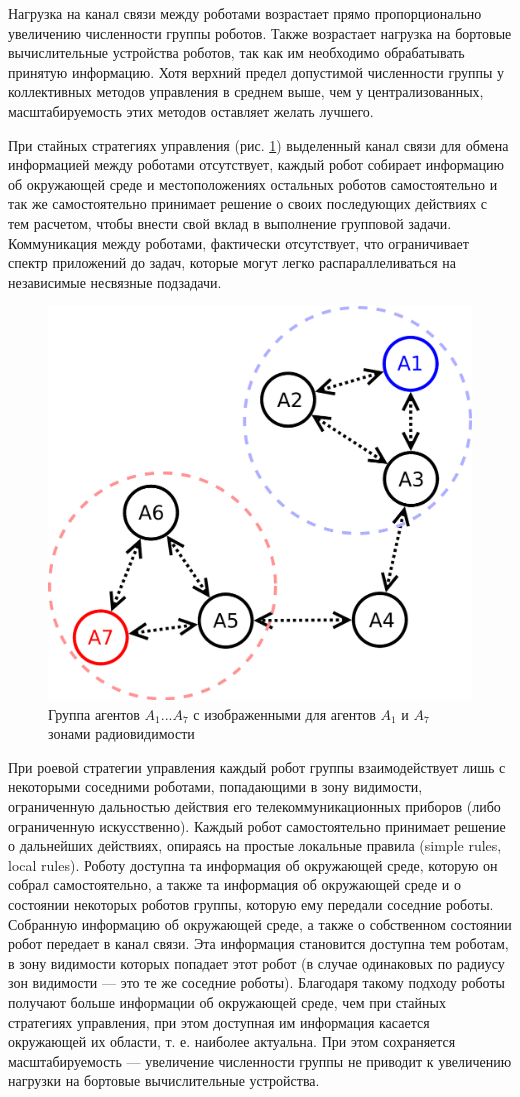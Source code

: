 \documentclass[a4paper, 14pt]{extarticle}
\begin{document}
Нагрузка на канал
связи между роботами возрастает прямо пропорционально увеличению численности группы роботов. Также возрастает нагрузка на бортовые вычислительные устройства роботов, так как им необходимо обрабатывать принятую информацию. Хотя
верхний предел допустимой численности группы у коллективных методов управления в среднем выше, чем у централизованных, масштабируемость этих методов оставляет желать лучшего. \par
\bigskip
При стайных стратегиях управления (рис. \ref{fig:decen-platoon-roe}) выделенный канал связи для обмена информацией между роботами отсутствует, каждый робот собирает информацию об окружающей среде и местоположениях остальных роботов самостоятельно и так же самостоятельно принимает решение о своих последующих действиях с тем расчетом, чтобы внести свой вклад в выполнение групповой задачи. Коммуникация между роботами, фактически отсутствует, что ограничивает спектр приложений до задач, которые могут легко распараллеливаться на независимые несвязные подзадачи. \par
\begin{figure}[!htbp]
	\centering
	\includegraphics[width=0.55\linewidth]{others/decen-platoon-roe}
	\caption{Группа агентов $A_1$...$A_7$ с изображенными для агентов $A_1$ и $A_7$ зонами радиовидимости}
	\label{fig:decen-platoon-roe}
\end{figure}

\bigskip
При роевой стратегии управления каждый робот
группы взаимодействует лишь с некоторыми
соседними роботами, попадающими в зону видимости, ограниченную дальностью действия
его телекоммуникационных приборов (либо ограниченную искусственно). Каждый робот
самостоятельно принимает решение о дальнейших действиях, опираясь на простые локальные правила (simple rules, local rules). Роботу
доступна та информация об окружающей среде, которую он собрал самостоятельно, а также
та информация об окружающей среде и о состоянии некоторых роботов группы, которую
ему передали соседние роботы. Собранную информацию об окружающей среде, а также
о собственном состоянии робот передает в канал связи. Эта информация становится доступна тем роботам, в зону видимости которых попадает этот робот (в случае одинаковых по радиусу зон видимости — это те же соседние
роботы). Благодаря такому подходу роботы получают больше информации об окружающей
среде, чем при стайных стратегиях управления,
при этом доступная им информация касается
окружающей их области, т. е. наиболее актуальна. При этом сохраняется масштабируемость — увеличение численности группы не
приводит к увеличению нагрузки на бортовые
вычислительные устройства. \par
\end{document}

